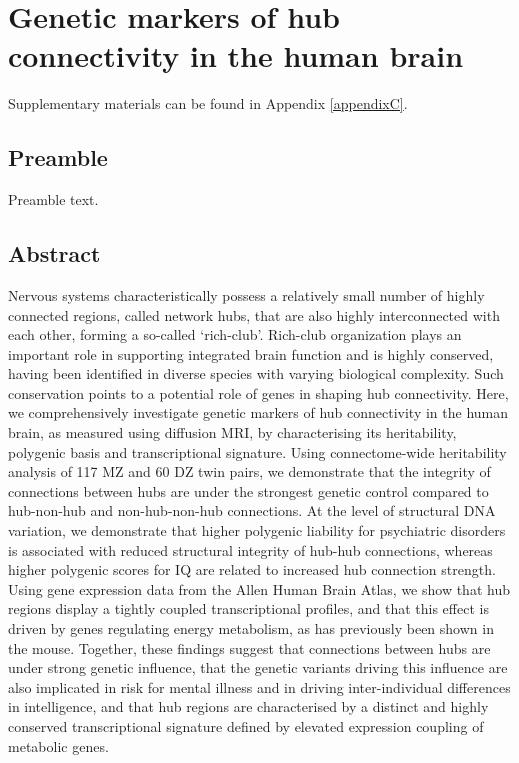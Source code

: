 \chapter{Genetic markers of hub connectivity in the human brain}
\label{ch:Chapter5}



Supplementary materials can be found in Appendix \ref{appendixC}.

\section*{Preamble}
Preamble text.

\newpage

\section*{Abstract}
Nervous systems characteristically possess a relatively small number of highly connected regions, called network hubs, that are also highly interconnected with each other, forming a so-called `rich-club’. Rich-club organization plays an important role in supporting integrated brain function and is highly conserved, having been identified in diverse species with varying biological complexity. Such conservation points to a potential role of genes in shaping hub connectivity. Here, we comprehensively investigate genetic markers of hub connectivity in the human brain, as measured using diffusion MRI, by characterising its heritability, polygenic basis and transcriptional signature. Using connectome-wide heritability analysis of 117 MZ and 60 DZ twin pairs, we demonstrate that the integrity of connections between hubs are under the strongest genetic control compared to hub-non-hub and non-hub-non-hub connections. At the level of structural DNA variation, we demonstrate that higher polygenic liability for psychiatric disorders is associated with reduced structural integrity of hub-hub connections, whereas higher polygenic scores for IQ are related to increased hub connection strength. Using gene expression data from the Allen Human Brain Atlas, we show that hub regions display a tightly coupled transcriptional profiles, and that this effect is driven by genes regulating energy metabolism, as has previously been shown in the mouse.  Together, these findings suggest that connections between hubs are under strong genetic influence, that the genetic variants driving this influence are also implicated in risk for mental illness and in driving inter-individual differences in intelligence, and that hub regions are characterised by a distinct and highly conserved transcriptional signature defined by elevated expression coupling of metabolic genes.

